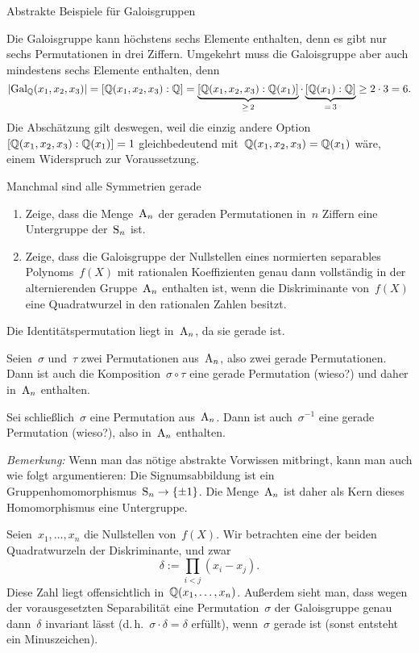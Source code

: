 \documentclass{algblatt}
\begin{document}
\begin{aufgabe}{Abstrakte Beispiele für Galoisgruppen}
\begin{loesungE}
\item Die Galoisgruppe kann höchstens sechs Elemente enthalten, denn es gibt
nur sechs Permutationen in drei Ziffern. Umgekehrt muss die Galoisgruppe aber
auch mindestens sechs Elemente enthalten, denn
\[ |\mathrm{Gal}_{\mathbb{Q}}(x_1,x_2,x_3)| = [\mathbb{Q}(x_1,x_2,x_3):\mathbb{Q}] =
  \underbrace{[\mathbb{Q}(x_1,x_2,x_3):\mathbb{Q}(x_1)]}_{\geq\,2} \cdot
  \underbrace{[\mathbb{Q}(x_1):\mathbb{Q}]}_{=\,3} \geq
  2 \cdot 3 = 6. \]
Die Abschätzung gilt deswegen, weil die einzig andere
Option~$[\mathbb{Q}(x_1,x_2,x_3):\mathbb{Q}(x_1)] = 1$ gleichbedeutend
mit~$\mathbb{Q}(x_1,x_2,x_3) = \mathbb{Q}(x_1)$ wäre, einem Widerspruch zur Voraussetzung.
\end{loesungE}
\end{aufgabe}

\begin{aufgabe}{Manchmal sind alle Symmetrien gerade}
\begin{enumerate}
\item Zeige, dass die Menge~$\mathrm{A}_n$ der geraden Permutationen in~$n$ Ziffern eine
Untergruppe der~$\mathrm{S}_n$ ist.

\item Zeige, dass die Galoisgruppe der Nullstellen eines normierten separables
Polynoms~$f(X)$ mit rationalen Koeffizienten genau dann vollständig in der
alternierenden Gruppe~$\mathrm{A}_n$ enthalten ist, wenn die Diskriminante von~$f(X)$
eine Quadratwurzel in den rationalen Zahlen besitzt.
\end{enumerate}

\begin{loesungE}
\item Die Identitätspermutation liegt in~$\mathrm{A}_n$, da sie gerade ist.

Seien~$\sigma$ und~$\tau$ zwei Permutationen aus~$\mathrm{A}_n$, also zwei gerade
Permutationen. Dann ist auch die Komposition~$\sigma \circ \tau$ eine gerade
Permutation (wieso?) und daher in~$\mathrm{A}_n$ enthalten.

Sei schließlich~$\sigma$ eine Permutation aus~$\mathrm{A}_n$. Dann ist
auch~$\sigma^{-1}$ eine gerade Permutation (wieso?), also in~$\mathrm{A}_n$ enthalten.

\emph{Bemerkung:} Wenn man das nötige abstrakte Vorwissen mitbringt, kann man
auch wie folgt argumentieren: Die Signumsabbildung ist ein
Gruppenhomomorphismus~$\mathrm{S}_n \to \{ \pm1 \}$. Die Menge~$\mathrm{A}_n$ ist daher als Kern
dieses Homomorphismus eine Untergruppe.

\item Seien~$x_1, \ldots, x_n$ die Nullstellen von~$f(X)$. Wir betrachten eine
der beiden Quadratwurzeln der Diskriminante, und zwar
\[ \delta := \prod_{i < j} (x_i - x_j). \]
Diese Zahl liegt offensichtlich in~$\mathbb{Q}(x_1,\ldots,x_n)$. Außerdem sieht man,
dass wegen der vorausgesetzten Separabilität eine Permutation~$\sigma$ der
Galoisgruppe genau dann~$\delta$ invariant lässt (d.\,h.~$\sigma \cdot \delta =
\delta$ erfüllt), wenn~$\sigma$ gerade ist (sonst entsteht ein Minuszeichen).


\end{loesungE}
\end{aufgabe}
\end{document}
